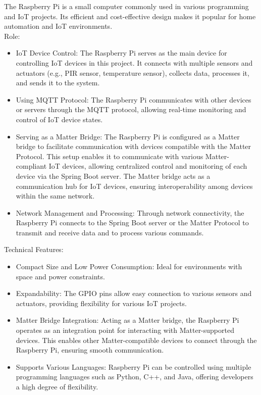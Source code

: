 \documentclass[conference]{IEEEtran}
\begin{document}
\noindent The Raspberry Pi is a small computer commonly used in various programming and IoT projects. Its efficient and cost-effective design makes it popular for home automation and IoT environments.\\

Role:
\begin{itemize}
    \item IoT Device Control: The Raspberry Pi serves as the main device for controlling IoT devices in this project. It connects with multiple sensors and actuators (e.g., PIR sensor, temperature sensor), collects data, processes it, and sends it to the system.\\
    \item Using MQTT Protocol: The Raspberry Pi communicates with other devices or servers through the MQTT protocol, allowing real-time monitoring and control of IoT device states.\\
    \item Serving as a Matter Bridge: The Raspberry Pi is configured as a Matter bridge to facilitate communication with devices compatible with the Matter Protocol. This setup enables it to communicate with various Matter-compliant IoT devices, allowing centralized control and monitoring of each device via the Spring Boot server. The Matter bridge acts as a communication hub for IoT devices, ensuring interoperability among devices within the same network.\\
    \item Network Management and Processing: Through network connectivity, the Raspberry Pi connects to the Spring Boot server or the Matter Protocol to transmit and receive data and to process various commands.\\
\end{itemize}

Technical Features:
\begin{itemize}
    \item Compact Size and Low Power Consumption: Ideal for environments with space and power constraints.\\
    \item Expandability: The GPIO pins allow easy connection to various sensors and actuators, providing flexibility for various IoT projects.\\
    \item Matter Bridge Integration: Acting as a Matter bridge, the Raspberry Pi operates as an integration point for interacting with Matter-supported devices. This enables other Matter-compatible devices to connect through the Raspberry Pi, ensuring smooth communication.\\
    \item Supports Various Languages: Raspberry Pi can be controlled using multiple programming languages such as Python, C++, and Java, offering developers a high degree of flexibility.\\
\end{itemize}
    
\end{document}

